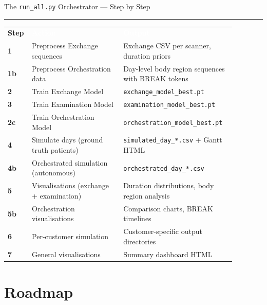 \documentclass[aspectratio=169,12pt]{beamer}
\newcommand{\tealsep}{\vspace{1pt}\textcolor{SiemensTeal}{\rule{\linewidth}{1pt}}\vspace{4pt}}
\begin{document}
\begin{frame}[shrink=18]{The \texttt{run\_all.py} Orchestrator --- Step by Step}
\tealsep
\vspace{4pt}
\begin{tabular}{p{0.06\linewidth}p{0.38\linewidth}p{0.44\linewidth}}
\rowcolor{SiemensNavy}
\textcolor{SiemensTeal}{\textbf{Step}} & \textcolor{white}{\textbf{Action}} & \textcolor{white}{\textbf{Output}} \\[2pt]
\rowcolor{SiemensLight}
\textbf{1}   & Preprocess Exchange sequences & Exchange CSV per scanner, duration priors \\[2pt]
\rowcolor{white}
\textbf{1b}  & Preprocess Orchestration data & Day-level body region sequences with BREAK tokens \\[2pt]
\rowcolor{SiemensLight}
\textbf{2}   & Train Exchange Model & \texttt{exchange\_model\_best.pt} \\[2pt]
\rowcolor{white}
\textbf{3}   & Train Examination Model & \texttt{examination\_model\_best.pt} \\[2pt]
\rowcolor{SiemensLight}
\textbf{2c}  & Train Orchestration Model & \texttt{orchestration\_model\_best.pt} \\[2pt]
\rowcolor{white}
\textbf{4}   & Simulate days (ground truth patients) & \texttt{simulated\_day\_*.csv} + Gantt HTML \\[2pt]
\rowcolor{SiemensLight}
\textbf{4b}  & Orchestrated simulation (autonomous) & \texttt{orchestrated\_day\_*.csv} \\[2pt]
\rowcolor{white}
\textbf{5}   & Visualisations (exchange + examination) & Duration distributions, body region analysis \\[2pt]
\rowcolor{SiemensLight}
\textbf{5b}  & Orchestration visualisations & Comparison charts, BREAK timelines \\[2pt]
\rowcolor{white}
\textbf{6}   & Per-customer simulation & Customer-specific output directories \\[2pt]
\rowcolor{SiemensLight}
\textbf{7}   & General visualisations & Summary dashboard HTML \\
\end{tabular}
\end{frame}

\section{Roadmap}
\end{document}
